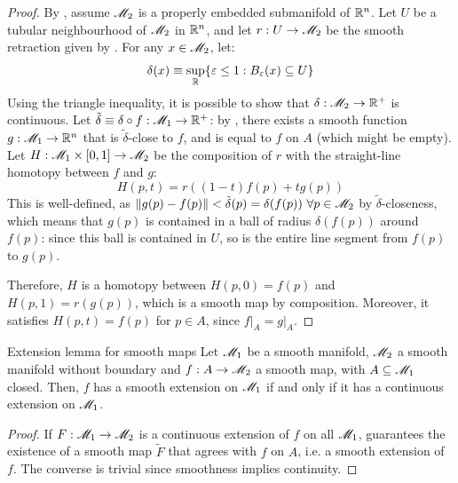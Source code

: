 \begin{proofbox}
  \begin{proof}
    By , assume $ \mathscr{M}_2 $ is a properly embedded submanifold of $ \mathbb{R}^n $. Let $ U $ be a tubular neighbourhood of $ \mathscr{M}_2 $ in $ \mathbb{R}^n $, and let $ r : U \rightarrow \mathscr{M}_2 $ be the smooth retraction given by . For any $ x \in \mathscr{M}_2 $, let:
    \begin{equation*}
      \delta(x) \equiv \sup_{\mathbb{R}} \{\varepsilon \leq 1 : B_\varepsilon(x) \subseteq U\}
    \end{equation*}
    Using the triangle inequality, it is possible to show that $ \delta : \mathscr{M}_2 \rightarrow \mathbb{R}^+ $ is continuous. Let $ \tilde{\delta} \equiv \delta \circ f : \mathscr{M}_1 \rightarrow \mathbb{R}^+ $: by , there exists a smooth function $ g : \mathscr{M}_1 \rightarrow \mathbb{R}^n $ that is $ \tilde{\delta} $-close to $ f $, and is equal to $ f $ on $ A $ (which might be empty). Let $ H : \mathscr{M}_1 \times [0,1] \rightarrow \mathscr{M}_2 $ be the composition of $ r $ with the straight-line homotopy between $ f $ and $ g $:
    \begin{equation*}
      H(p,t) = r((1-t) f(p) + t g(p))
    \end{equation*}
    This is well-defined, as $ \left\lVert g(p) - f(p)\right\rVert < \tilde{\delta}(p) = \delta(f(p)) \,\,\forall p \in \mathscr{M}_2 $ by $ \tilde{\delta} $-closeness, which means that $ g(p) $ is contained in a ball of radius $ \delta(f(p)) $ around $ f(p) $: since this ball is contained in $ U $, so is the entire line segment from $ f(p) $ to $ g(p) $.

    Therefore, $ H $ is a homotopy between $ H(p,0) = f(p) $ and $ H(p,1) = r(g(p)) $, which is a smooth map by composition. Moreover, it satisfies $ H(p,t) = f(p) $ for $ p \in A $, since $ f \vert_A = g \vert_A $.
  \end{proof}
\end{proofbox}

\begin{corollary}{Extension lemma for smooth maps}{}
  Let $ \mathscr{M}_1 $ be a smooth manifold, $ \mathscr{M}_2 $ a smooth manifold without boundary and $ f : A \rightarrow \mathscr{M}_2 $ a smooth map, with $ A \subseteq \mathscr{M}_1 $ closed. Then, $ f $ has a smooth extension on $ \mathscr{M}_1 $ if and only if it has a continuous extension on $ \mathscr{M}_1 $.
\end{corollary}

\begin{proofbox}
  \begin{proof}
    If $ F : \mathscr{M}_1 \rightarrow \mathscr{M}_2 $ is a continuous extension of $ f $ on all $ \mathscr{M}_1 $,  guarantees the existence of a smooth map $ \tilde{F} $ that agrees with $ f $ on $ A $, i.e. a smooth extension of $ f $. The converse is trivial since smoothness implies continuity.
  \end{proof}
\end{proofbox}


